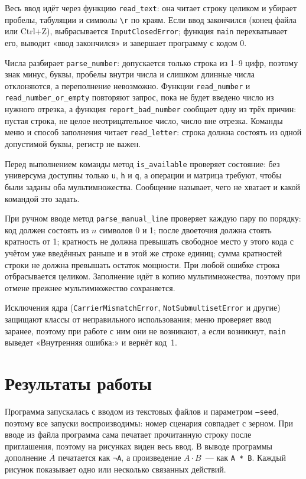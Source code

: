 \documentclass[14pt,a4paper]{extarticle}
\newcommand{\code}[1]{\texttt{#1}}
\newcommand{\us}{\_\allowbreak{}}
\begin{document}
Весь ввод идёт через функцию \code{read\us{}text}: она читает строку целиком и убирает пробелы, табуляции и символы \code{\textbackslash r} по краям. Если ввод закончился (конец файла или Ctrl+Z), выбрасывается \code{InputClosedError}; функция \code{main} перехватывает его, выводит «ввод закончился» и завершает программу с кодом 0.

Числа разбирает \code{parse\us{}number}: допускается только строка из 1--9 цифр, поэтому знак минус, буквы, пробелы внутри числа и слишком длинные числа отклоняются, а переполнение невозможно. Функции \code{read\us{}number} и \code{read\us{}number\us{}or\us{}empty} повторяют запрос, пока не будет введено число из нужного отрезка, а функция \code{report\us{}bad\us{}number} сообщает одну из трёх причин: пустая строка, не целое неотрицательное число, число вне отрезка. Команды меню и способ заполнения читает \code{read\us{}letter}: строка должна состоять из одной допустимой буквы, регистр не важен.

Перед выполнением команды метод \code{is\us{}available} проверяет состояние: без универсума доступны только \code{u}, \code{h} и \code{q}, а операции и матрица требуют, чтобы были заданы оба мультимножества. Сообщение называет, чего не хватает и какой командой это задать.

При ручном вводе метод \code{parse\us{}manual\us{}line} проверяет каждую пару по порядку: код должен состоять из $n$ символов 0 и 1; после двоеточия должна стоять кратность от 1; кратность не должна превышать свободное место у этого кода с учётом уже введённых раньше и в этой же строке единиц; сумма кратностей строки не должна превышать остаток мощности. При любой ошибке строка отбрасывается целиком. Заполнение идёт в копию мультимножества, поэтому при отмене прежнее мультимножество сохраняется.

Исключения ядра (\code{CarrierMismatchError}, \code{NotSubmultisetError} и другие) защищают классы от неправильного использования; меню проверяет ввод заранее, поэтому при работе с ним они не возникают, а если возникнут, \code{main} выведет «Внутренняя ошибка:» и вернёт код~1.

\section{Результаты работы}

Программа запускалась с вводом из текстовых файлов и параметром \code{--seed}, поэтому все запуски воспроизводимы: номер сценария совпадает с зерном. При вводе из файла программа сама печатает прочитанную строку после приглашения, поэтому на рисунках виден весь ввод. В выводе программы дополнение $\overline{A}$ печатается как \code{¬A}, а произведение $A \cdot B$~--- как \code{A * B}. Каждый рисунок показывает одно или несколько связанных действий.
\end{document}
